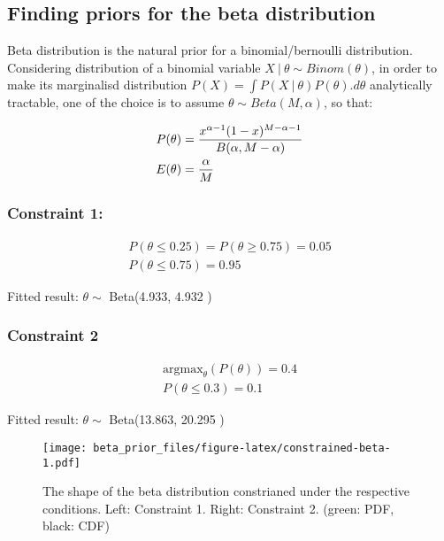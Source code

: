 \documentclass[]{article}
\title{}
\author{}
\date{16 March, 2018}
\newcommand\gvn[1][]{\:#1\vert\:}
\begin{document}
{
\setcounter{tocdepth}{2}
\tableofcontents
}
\subsection{Finding priors for the beta
distribution}\label{finding-priors-for-the-beta-distribution}

Beta distribution is the natural prior for a binomial/bernoulli
distribution. Considering distribution of a binomial variable
\(X\gvn\theta\sim Binom(\theta)\), in order to make its marginalisd
distribution \(P(X) = \int P(X\gvn\theta)P(\theta).d\theta\)
analytically tractable, one of the choice is to assume
\(\theta\sim Beta(M,\alpha)\), so that:

\[
\begin{aligned}
P(\theta) &=\frac{x^{\alpha - 1}(1-x)^{M-\alpha-1}}{B(\alpha,M-\alpha)}
\\
E(\theta) &={\alpha\over M }
\end{aligned}
\]

\subsubsection{Constraint 1:}\label{constraint-1}

\[
\begin{aligned}
P(\theta\le 0.25) = P(\theta\ge 0.75) =  0.05 \\
P(\theta\le 0.75)=0.95
\end{aligned}
\]

Fitted result: \(\theta\sim\) Beta(4.933, 4.932 )

\subsubsection{Constraint 2}\label{constraint-2}

\[
\begin{aligned}
\text{argmax}_\theta(P(\theta))=0.4 \\
P(\theta\le 0.3) = 0.1
\end{aligned}
\]

Fitted result: \(\theta\sim\) Beta(13.863, 20.295 )

\begin{figure}
\centering
\texttt{[image: beta\_prior\_files/figure-latex/constrained-beta-1.pdf]}
\caption{\label{fig:constrained-beta}The shape of the beta distribution
constrianed under the respective conditions. Left: Constraint 1. Right:
Constraint 2. (green: PDF, black: CDF)}
\end{figure}
\end{document}
